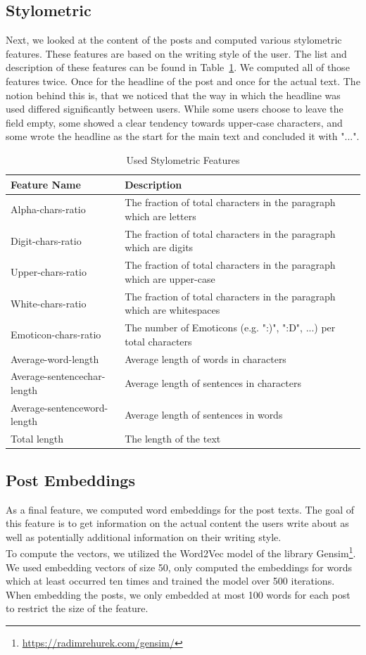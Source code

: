 \documentclass[acmsmall]{acmart}
\begin{document}
\subsection{Stylometric}
Next, we looked at the content of the posts and computed various stylometric features. These features are based on the writing style of the user. The list and description of these features can be found in Table~\ref{tab:stylometric}. We computed all of those features twice. Once for the headline of the post and once for the actual text. The notion behind this is, that we noticed that the way in which the headline was used differed significantly between users. While some users choose to leave the field empty, some showed a clear tendency towards upper-case characters, and some wrote the headline as the start for the main text and concluded it with "...". 

\begin{table}[H]
\begin{tabularx}{\textwidth}{lX}
Feature Name & Description \\ \hline
Alpha-chars-ratio & The fraction of total characters in the paragraph which are letters \\
Digit-chars-ratio & The fraction of total characters in the paragraph which are digits \\
Upper-chars-ratio & The fraction of total characters in the paragraph which are upper-case \\
White-chars-ratio & The fraction of total characters in the paragraph which are whitespaces \\
Emoticon-chars-ratio & The number of Emoticons (e.g. ":)", ":D", ...) per total characters \\
Average-word-length & Average length of words in characters \\
Average-sentencechar-length & Average length of sentences in characters \\
Average-sentenceword-length & Average length of sentences in words \\
Total length & The length of the text \\
\end{tabularx}
\caption{Used Stylometric Features}
\label{tab:stylometric}
\end{table}

\subsection{Post Embeddings}
As a final feature, we computed word embeddings for the post texts. The goal of this feature is to get information on the actual content the users write about as well as potentially additional information on their writing style. \\
To compute the vectors, we utilized the Word2Vec model of the library Gensim\footnote{\url{https://radimrehurek.com/gensim/}}. 
We used embedding vectors of size 50, only computed the embeddings for words which at least occurred ten times and trained the model over 500 iterations. 
When embedding the posts, we only embedded at most 100 words for each post to restrict the size of the feature.  
\end{document}
